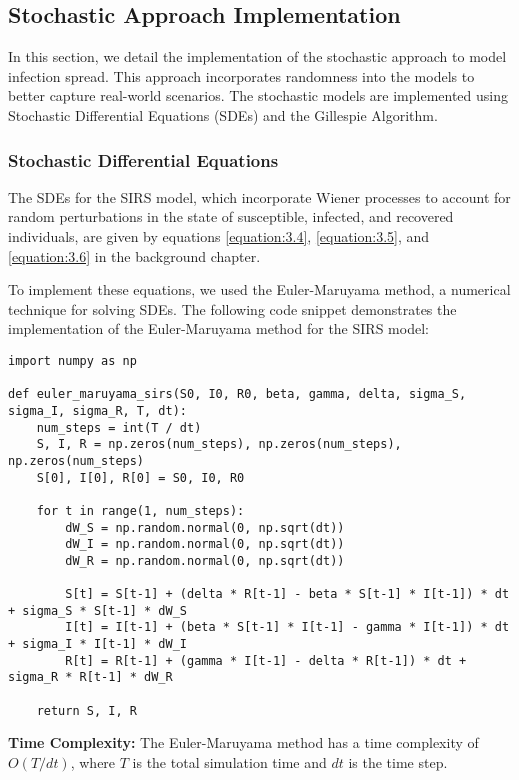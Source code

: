 \subsection{Stochastic Approach Implementation}
In this section, we detail the implementation of the stochastic approach to model infection spread. This approach incorporates randomness into the models to better capture real-world scenarios. The stochastic models are implemented using Stochastic Differential Equations (SDEs) and the Gillespie Algorithm.

\subsubsection{Stochastic Differential Equations}
The SDEs for the SIRS model, which incorporate Wiener processes to account for random perturbations in the state of susceptible, infected, and recovered individuals, are given by equations \ref{equation:3.4}, \ref{equation:3.5}, and \ref{equation:3.6} in the background chapter.

To implement these equations, we used the Euler-Maruyama method, a numerical technique for solving SDEs. The following code snippet demonstrates the implementation of the Euler-Maruyama method for the SIRS model:

\begin{lstlisting}[caption=Euler-Maruyama Method for SIRS Model, label=lst:euler-maruyama]
import numpy as np

def euler_maruyama_sirs(S0, I0, R0, beta, gamma, delta, sigma_S, sigma_I, sigma_R, T, dt):
    num_steps = int(T / dt)
    S, I, R = np.zeros(num_steps), np.zeros(num_steps), np.zeros(num_steps)
    S[0], I[0], R[0] = S0, I0, R0

    for t in range(1, num_steps):
        dW_S = np.random.normal(0, np.sqrt(dt))
        dW_I = np.random.normal(0, np.sqrt(dt))
        dW_R = np.random.normal(0, np.sqrt(dt))

        S[t] = S[t-1] + (delta * R[t-1] - beta * S[t-1] * I[t-1]) * dt + sigma_S * S[t-1] * dW_S
        I[t] = I[t-1] + (beta * S[t-1] * I[t-1] - gamma * I[t-1]) * dt + sigma_I * I[t-1] * dW_I
        R[t] = R[t-1] + (gamma * I[t-1] - delta * R[t-1]) * dt + sigma_R * R[t-1] * dW_R

    return S, I, R
\end{lstlisting}

\textbf{Time Complexity:} The Euler-Maruyama method has a time complexity of \(O(T / dt)\), where \(T\) is the total simulation time and \(dt\) is the time step.

